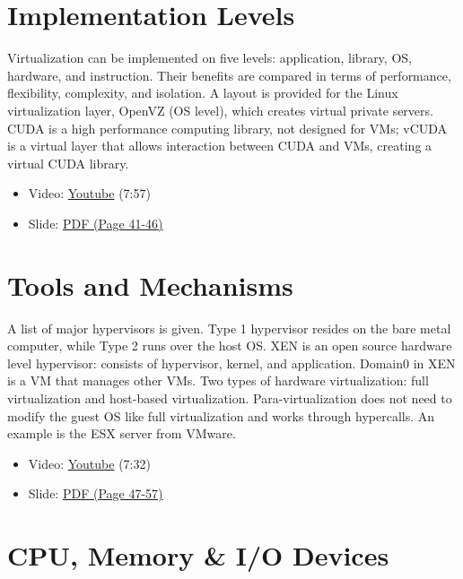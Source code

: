 \section{Implementation Levels}\label{implementation-levels}

Virtualization can be implemented on five levels: application, library,
OS, hardware, and instruction. Their benefits are compared in terms of
performance, flexibility, complexity, and isolation. A layout is
provided for the Linux virtualization layer, OpenVZ (OS level), which
creates virtual private servers. CUDA is a high performance computing
library, not designed for VMs; vCUDA is a virtual layer that allows
interaction between CUDA and VMs, creating a virtual CUDA library.

\begin{itemize}

\item
  Video: \href{https://www.youtube.com/watch?v=Le-kv-eAhvg}{Youtube}
  (7:57)
\item
  Slide:
  \href{https://drive.google.com/open?id=0B88HKpainTSfQU1uQmxZWHdWQ1k}{PDF
  (Page 41-46)}
\end{itemize}

\section{Tools and Mechanisms}\label{tools-and-mechanisms}

A list of major hypervisors is given. Type 1 hypervisor resides on the
bare metal computer, while Type 2 runs over the host OS. XEN is an open
source hardware level hypervisor: consists of hypervisor, kernel, and
application. Domain0 in XEN is a VM that manages other VMs. Two types of
hardware virtualization: full virtualization and host-based
virtualization. Para-virtualization does not need to modify the guest OS
like full virtualization and works through hypercalls. An example is the
ESX server from VMware.

\begin{itemize}

\item
  Video: \href{https://www.youtube.com/watch?v=VYz5rp5HDVE}{Youtube}
  (7:32)
\item
  Slide:
  \href{https://drive.google.com/open?id=0B88HKpainTSfQU1uQmxZWHdWQ1k}{PDF
  (Page 47-57)}
\end{itemize}

\section{CPU, Memory \& I/O Devices}\label{cpu-memory-io-devices}

